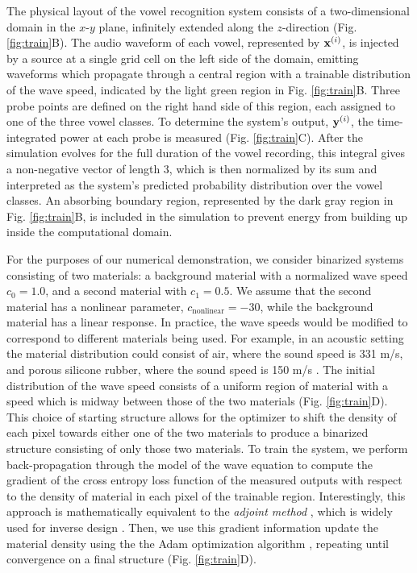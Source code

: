 The physical layout of the vowel recognition system consists of a two-dimensional domain in the $x$-$y$ plane, infinitely extended along the $z$-direction (Fig. \ref{fig:train}B). 
The audio waveform of each vowel, represented by $\mathbf{x}^{(i)}$, is injected by a source at a single grid cell on the left side of the domain, emitting waveforms which propagate through a central region with a trainable distribution of the wave speed, indicated by the light green region in Fig. \ref{fig:train}B. 
Three probe points are defined on the right hand side of this region, each assigned to one of the three vowel classes. 
To determine the system's output, $\mathbf{y}^{(i)}$, the time-integrated power at each probe is measured (Fig. \ref{fig:train}C). 
After the simulation evolves for the full duration of the vowel recording, this integral gives a non-negative vector of length 3, which is then normalized by its sum and interpreted as the system's predicted probability distribution over the vowel classes. 
An absorbing boundary region, represented by the dark gray region in Fig. \ref{fig:train}B, is included in the simulation to prevent energy from building up inside the computational domain. 

For the purposes of our numerical demonstration, we consider binarized systems consisting of two materials: a background material with a normalized wave speed $c_0 = 1.0$, and a second material with $c_1 = 0.5$.
We assume that the second material has a nonlinear parameter, $c_{\text{nonlinear}} = -30$, while the background material has a linear response.
In practice, the wave speeds would be modified to correspond to different materials being used.
For example, in an acoustic setting the material distribution could consist of air, where the sound speed is 331 m/s, and porous silicone rubber, where the sound speed is 150 m/s \cite{ba_soft_2017}.
The initial distribution of the wave speed consists of a uniform region of material with a speed which is midway between those of the two materials (Fig. \ref{fig:train}D).
This choice of starting structure allows for the optimizer to shift the density of each pixel towards either one of the two materials to produce a binarized structure consisting of only those two materials. 
To train the system, we perform back-propagation through the model of the wave equation to compute the gradient of the cross entropy loss function of the measured outputs with respect to the density of material in each pixel of the trainable region.
Interestingly, this approach is mathematically equivalent to the \textit{adjoint method} \cite{hughes_training_2018}, which is widely used for inverse design \cite{molesky2018inverse, hughes_training_2018, elesin_design_2012}.
Then, we use this gradient information update the material density using the the Adam optimization algorithm \cite{kingma2014adam}, repeating until convergence on a final structure (Fig. \ref{fig:train}D).

